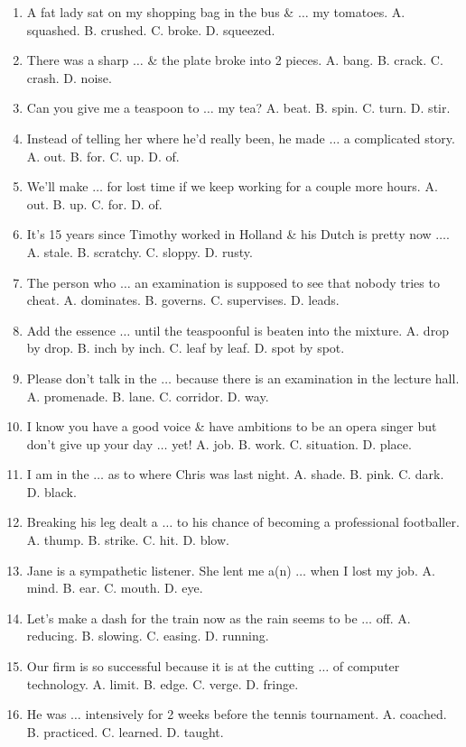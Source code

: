 \documentclass{article}
\numberwithin{equation}{section}
\begin{document}
\begin{enumerate}[leftmargin=2mm]
	\item A fat lady sat on my shopping bag in the bus \& $\ldots$ my tomatoes. A. squashed. B. crushed. C. broke. D. squeezed.
	\item There was a sharp $\ldots$ \& the plate broke into 2 pieces. A. bang. B. crack. C. crash. D. noise.
	\item Can you give me a teaspoon to $\ldots$ my tea? A. beat. B. spin. C. turn. D. stir.
	\item Instead of telling her where he'd really been, he made $\ldots$ a complicated story. A. out. B. for. C. up. D. of.
	\item We'll make $\ldots$ for lost time if we keep working for a couple more hours. A. out. B. up. C. for. D. of.
	\item It's 15 years since Timothy worked in Holland \& his Dutch is pretty now $\ldots$. A. stale. B. scratchy. C. sloppy. D. rusty.
	\item The person who $\ldots$ an examination is supposed to see that nobody tries to cheat. A. dominates. B. governs. C. supervises. D. leads.
	\item Add the essence $\ldots$ until the teaspoonful is beaten into the mixture. A. drop by drop. B. inch by inch. C. leaf by leaf. D. spot by spot.
	\item Please don't talk in the $\ldots$ because there is an examination in the lecture hall. A. promenade. B. lane. C. corridor. D. way.
	\item I know you have a good voice \& have ambitions to be an opera singer but don't give up your day $\ldots$ yet! A. job. B. work. C. situation. D. place.
	\item I am in the $\ldots$ as to where Chris was last night. A. shade. B. pink. C. dark. D. black.
	\item Breaking his leg dealt a $\ldots$ to his chance of becoming a professional footballer. A. thump. B. strike. C. hit. D. blow.
	\item Jane is a sympathetic listener. She lent me a(n) $\ldots$ when I lost my job. A. mind. B. ear. C. mouth. D. eye.
	\item Let's make a dash for the train now as the rain seems to be $\ldots$ off. A. reducing. B. slowing. C. easing. D. running.
	\item Our firm is so successful because it is at the cutting $\ldots$ of computer technology. A. limit. B. edge. C. verge. D. fringe.
	\item He was $\ldots$ intensively for 2 weeks before the tennis tournament. A. coached. B. practiced. C. learned. D. taught.

\end{enumerate}
\end{document}
